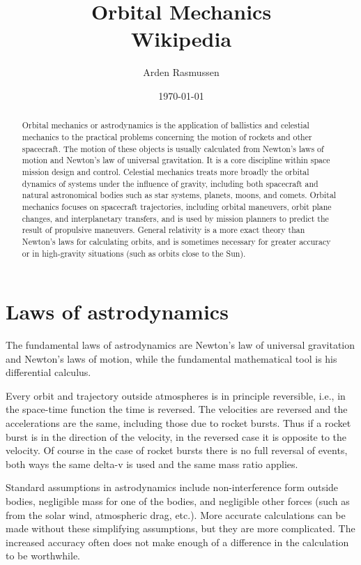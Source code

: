 \documentclass[12pt]{article}
\title{Orbital Mechanics\\\small{Wikipedia}}
\date{\today}
\author{Arden Rasmussen}
\begin{document}
\maketitle
\newpage
{}
\begin{abstract}
  Orbital mechanics or astrodynamics is the application of ballistics and celestial mechanics to the practical problems concerning the motion of rockets and other spacecraft. The motion of these objects is usually calculated from Newton's laws of motion and Newton's law of universal gravitation. It is a core discipline within space mission design and control. Celestial mechanics treats more broadly the orbital dynamics of systems under the influence of gravity, including both spacecraft and natural astronomical bodies such as star systems, planets, moons, and comets. Orbital mechanics focuses on spacecraft trajectories, including orbital maneuvers, orbit plane changes, and interplanetary transfers, and is used by mission planners to predict the result of propulsive maneuvers. General relativity is a more exact theory than Newton's laws for calculating orbits, and is sometimes necessary for greater accuracy or in high-gravity situations (such as orbits close to the Sun).
\end{abstract}
\newpage
\tableofcontents
\newpage
{}

\section{Laws of astrodynamics}

The fundamental laws of astrodynamics are Newton's law of universal gravitation and Newton's laws of motion, while the fundamental mathematical tool is his differential calculus.

Every orbit and trajectory outside atmospheres is in principle reversible, i.e., in the space-time function the time is reversed. The velocities are reversed and the accelerations are the same, including those due to rocket bursts. Thus if a rocket burst is in the direction of the velocity, in the reversed case it is opposite to the velocity. Of course in the case of rocket bursts there is no full reversal of events, both ways the same delta-v is used and the same mass ratio applies.

Standard assumptions in astrodynamics include non-interference form outside bodies, negligible mass for one of the bodies, and negligible other forces (such as from the solar wind, atmospheric drag, etc.). More accurate calculations can be made without these simplifying assumptions, but they are more complicated. The increased accuracy often does not make enough of a difference in the calculation to be worthwhile.
\end{document}

